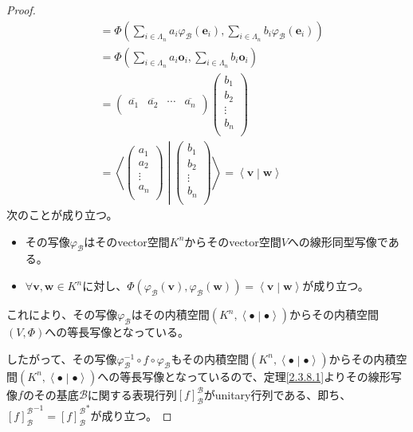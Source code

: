 \documentclass[dvipdfmx]{jsarticle}
\begin{document}
\begin{proof}
\begin{align*}
&= \varPhi\left( \sum_{i \in \varLambda_{n}} {a_{i}\varphi_{\mathcal{B}}\left( \mathbf{e}_{i} \right)},\sum_{i \in \varLambda_{n}} {b_{i}\varphi_{\mathcal{B}}\left( \mathbf{e}_{i} \right)} \right)\\
&= \varPhi\left( \sum_{i \in \varLambda_{n}} {a_{i}\mathbf{o}_{i}},\sum_{i \in \varLambda_{n}} {b_{i}\mathbf{o}_{i}} \right)\\
&= \begin{pmatrix}
\overline{a_{1}} & \overline{a_{2}} & \cdots & \overline{a_{n}} \\
\end{pmatrix}\begin{pmatrix}
b_{1} \\
b_{2} \\
 \vdots \\
b_{n} \\
\end{pmatrix}\\
&= \left\langle \begin{pmatrix}
a_{1} \\
a_{2} \\
 \vdots \\
a_{n} \\
\end{pmatrix} \middle| \begin{pmatrix}
b_{1} \\
b_{2} \\
 \vdots \\
b_{n} \\
\end{pmatrix} \right\rangle = \left\langle \mathbf{v} \middle| \mathbf{w} \right\rangle
\end{align*}
次のことが成り立つ。
\begin{itemize}
\item
  その写像$\varphi_{\mathcal{B}}$はそのvector空間$K^{n}$からそのvector空間$V$への線形同型写像である。
\item
  $\forall\mathbf{v},\mathbf{w} \in K^{n}$に対し、$\varPhi\left( \varphi_{\mathcal{B}}\left( \mathbf{v} \right),\varphi_{\mathcal{B}}\left( \mathbf{w} \right) \right) = \left\langle \mathbf{v} \middle| \mathbf{w} \right\rangle$が成り立つ。
\end{itemize}
これにより、その写像$\varphi_{\mathcal{B}}$はその内積空間$\left( K^{n},\left\langle \bullet \middle| \bullet \right\rangle \right)$からその内積空間$(V,\varPhi)$への等長写像となっている。\par
したがって、その写像$\varphi_{\mathcal{B}}^{- 1} \circ f \circ \varphi_{\mathcal{B}}$もその内積空間$\left( K^{n},\left\langle \bullet \middle| \bullet \right\rangle \right)$からその内積空間$\left( K^{n},\left\langle \bullet \middle| \bullet \right\rangle \right)$への等長写像となっているので、定理\ref{2.3.8.1}よりその線形写像$f$のその基底$\mathcal{B}$に関する表現行列$[ f]_{\mathcal{B}}^{\mathcal{B}}$がunitary行列である、即ち、${[ f]_{\mathcal{B}}^{\mathcal{B}}}^{- 1} = {[ f]_{\mathcal{B}}^{\mathcal{B}}}^{*}$が成り立つ。\par

\end{proof}
\end{document}
